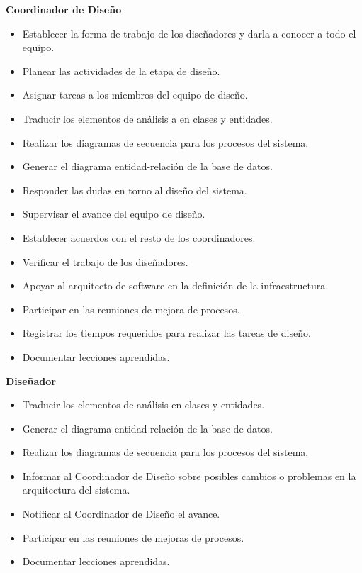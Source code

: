 \documentclass[10pt]{article}
\begin{document}
\textbf{Coordinador de Diseño}
\begin{itemize}
 \item Establecer la forma de trabajo de los diseñadores y darla a conocer a todo el equipo.
 \item Planear las actividades de la etapa de diseño.
 \item Asignar tareas a los miembros del equipo de diseño.
 \item Traducir los elementos de análisis a en clases y entidades.
 \item Realizar los diagramas de secuencia para los procesos del sistema.
 \item Generar el diagrama entidad-relación de la base de datos.
 \item Responder las dudas en torno al diseño del sistema.
 \item Supervisar el avance del equipo de diseño.
 \item Establecer acuerdos con el resto de los coordinadores.
 \item Verificar el trabajo de los diseñadores.
 \item Apoyar al arquitecto de software en la definición de la infraestructura.
 \item Participar en las reuniones de mejora de procesos.
 \item Registrar los tiempos requeridos para realizar las tareas de diseño.
 \item Documentar lecciones aprendidas.\\
\end{itemize}
\newpage 
\textbf{Diseñador}
\begin{itemize}
 \item Traducir los elementos de análisis en clases y entidades.
 \item Generar el diagrama entidad-relación de la base de datos.
 \item Realizar los diagramas de secuencia para los procesos del sistema.
 \item Informar al Coordinador de Diseño sobre posibles cambios o problemas en la arquitectura del sistema.
 \item Notificar al Coordinador de Diseño el avance.
 \item Participar en las reuniones de mejoras de procesos.
 \item Documentar lecciones aprendidas.\\
\end{itemize}
\end{document}
